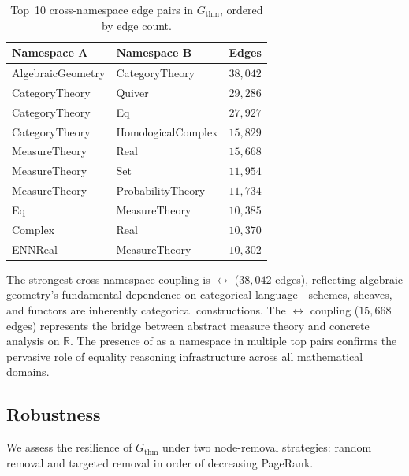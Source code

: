 \begin{table}[ht]
\centering
\caption{Top~10 cross-namespace edge pairs in $G_{\mathrm{thm}}$, ordered by edge count.}
\label{tab:thm-cross-ns-pairs}
\small
\begin{tabular}{llr}
\toprule
Namespace A & Namespace B & Edges \\
\midrule
AlgebraicGeometry  & CategoryTheory    & $38{,}042$ \\
CategoryTheory     & Quiver            & $29{,}286$ \\
CategoryTheory     & Eq                & $27{,}927$ \\
CategoryTheory     & HomologicalComplex & $15{,}829$ \\
MeasureTheory      & Real              & $15{,}668$ \\
MeasureTheory      & Set               & $11{,}954$ \\
MeasureTheory      & ProbabilityTheory & $11{,}734$ \\
Eq                 & MeasureTheory     & $10{,}385$ \\
Complex            & Real              & $10{,}370$ \\
ENNReal            & MeasureTheory     & $10{,}302$ \\
\bottomrule
\end{tabular}
\end{table}

The strongest cross-namespace coupling is  $\leftrightarrow$  ($38{,}042$ edges), reflecting algebraic geometry's fundamental dependence on categorical language---schemes, sheaves, and functors are inherently categorical constructions. The  $\leftrightarrow$  coupling ($15{,}668$ edges) represents the bridge between abstract measure theory and concrete analysis on $\mathbb{R}$. The presence of  as a namespace in multiple top pairs confirms the pervasive role of equality reasoning infrastructure across all mathematical domains.

\subsection{Robustness}
\label{sec:thm-robustness}

We assess the resilience of $G_{\mathrm{thm}}$ under two node-removal strategies: random removal and targeted removal in order of decreasing PageRank.

